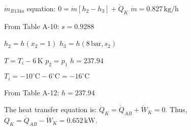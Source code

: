 \( \dot{m}_{R134a} \) equation:  
\( 0 = \dot{m} [h_2 - h_3] + \dot{Q}_K \)  
\( \dot{m} = 0.827 \, \text{kg/h} \)  

From Table A-10:  
\( s = 0.9288 \)  

\( h_2 = h(x_2 = 1) \)  
\( h_3 = h(8 \, \text{bar}, s_2) \)  

\( T = T_i - 6 \, \text{K} \)  
\( p_2 = p_1 \)  
\( h = 237.94 \)  

\( T_i = -10^\circ \text{C} - 6^\circ \text{C} = -16^\circ \text{C} \)  

From Table A-12:  
\( h = 237.94 \)

The heat transfer equation is:  
\( \dot{Q}_K = \dot{Q}_{AB} + \dot{W}_K = 0 \).  
Thus, \( \dot{Q}_K = \dot{Q}_{AB} - \dot{W}_K = 0.652 \, \text{kW} \).